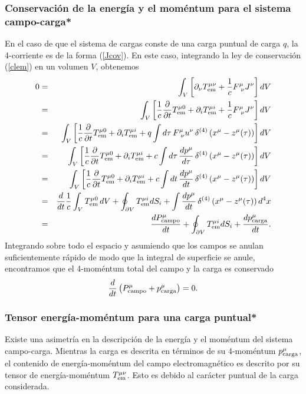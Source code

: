 \subsubsection{Conservación de la energía y el moméntum para el sistema
campo-carga*}

En el caso de que el sistema de cargas conste de una carga puntual de carga $q$,
la 4-corriente es de la forma (\ref{Jcov}). En este caso, integrando la ley de
conservación (\ref{clem}) en un volumen $V$, obtenemos
\begin{eqnarray}
0&=&\int_V \left[ \partial_\nu T_{\rm em}^{\mu\nu}+\frac{1}{c} F^\mu_{\
\nu}J^\nu\right]  dV \\
&=&\int_V \left[\frac{1}{c} \frac{\partial}{\partial t} T_{\rm em}^{\mu
0}+\partial_i T_{\rm em}^{\mu i}+\frac{1}{c} F^\mu_{\ \nu}J^\nu\right]  dV \\
&=&\int_V \left[\frac{1}{c} \frac{\partial}{\partial t} T_{\rm em}^{\mu
0}+\partial_i T_{\rm em}^{\mu i}+q\int d\tau\,  F^\mu_{\
\nu}u^\nu\,\delta^{(4)}\left(x^\mu-z^\mu(\tau)\right)\right]  dV \\
&=&\int_V \left[\frac{1}{c} \frac{\partial}{\partial t} T_{\rm em}^{\mu
0}+\partial_i T_{\rm em}^{\mu i}+c\int d\tau\,
\frac{dp^\mu}{d\tau}\,\delta^{(4)}\left(x^\mu-z^\mu(\tau)\right)\right]  dV \\
&=&\int_V \left[\frac{1}{c} \frac{\partial}{\partial t} T_{\rm em}^{\mu
0}+\partial_i T_{\rm em}^{\mu i}+c\int dt\,
\frac{dp^\mu}{dt}\,\delta^{(4)}\left(x^\mu-z^\mu(\tau)\right)\right]  dV
\\
&=&\frac{d}{dt}\frac{1}{c}\int_V  T_{\rm em}^{\mu 0}\,dV+\oint_{\partial V}T_{\rm em}^{\mu
i}dS_i+\int \frac{dp^\mu}{dt}\,\delta^{(4)}\left(x^\mu-z^\mu(\tau)\right)  d^4x
\\
&=&\frac{dP^\mu_{\rm campo}}{dt}+\oint_{\partial V}T_{\rm em}^{\mu
i}dS_i+\frac{dp^\mu_{\rm carga}}{dt}.
\end{eqnarray}
Integrando sobre todo el espacio y asumiendo que los campos se anulan
suficientemente rápido de modo que la integral de superficie se anule,
encontramos que el 4-moméntum total del campo y la carga es conservado
\begin{equation}
\frac{d}{dt}\left( P^\mu_{\rm campo}+p^\mu_{\rm carga}\right) =0.
\end{equation}

\subsubsection{Tensor energía-moméntum para una carga puntual*}
Existe una asimetría en la descripción de la energía y el moméntum del
sistema campo-carga. Mientras la carga es descrita en términos de su 4-moméntum
$p^\mu_{\rm carga}$, el contenido de energía-moméntum del campo
electromagnético es descrito por su tensor de energía-moméntum
$T_{\rm em}^{\mu\nu}$. Esto es debido al carácter puntual de la carga considerada.


